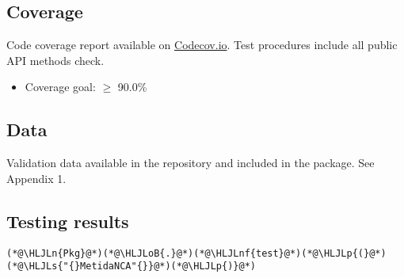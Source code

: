 \documentclass[12pt,a4paper]{article}
\newcommand{\HLJLn}[1]{#1}
\newcommand{\HLJLnf}[1]{\textcolor[RGB]{66,102,213}{#1}}
\newcommand{\HLJLs}[1]{\textcolor[RGB]{201,61,57}{#1}}
\newcommand{\HLJLoB}[1]{\textcolor[RGB]{102,102,102}{\textbf{#1}}}
\newcommand{\HLJLp}[1]{#1}
\begin{document}
\subsection{Coverage}
Code coverage report available on \href{https://app.codecov.io/gh/PharmCat/MetidaNCA.jl}{Codecov.io}. Test procedures include all  public API methods check.

\begin{itemize}
\item Coverage goal: \ensuremath{\geq} 90.0\%

\end{itemize}
\subsection{Data}
Validation data available in the repository and included in the package. See Appendix 1.

\subsection{Testing results}

\begin{lstlisting}
(*@\HLJLn{Pkg}@*)(*@\HLJLoB{.}@*)(*@\HLJLnf{test}@*)(*@\HLJLp{(}@*)(*@\HLJLs{"{}MetidaNCA"{}}@*)(*@\HLJLp{)}@*)
\end{lstlisting}
\end{document}
